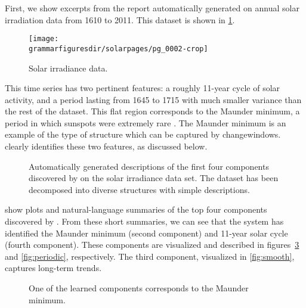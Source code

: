 First, we show excerpts from the report automatically generated on annual solar irradiation data from 1610 to 2011.
This dataset is shown in \cref{fig:solar}.
%
\begin{figure}[ht!]
\centering
\texttt{[image: \\grammarfiguresdir/solarpages/pg\_0002-crop]}
\caption[Solar irradiance dataset]
{Solar irradiance data.}
\label{fig:solar}
\end{figure}

This time series has two pertinent features: a roughly 11-year cycle of solar activity, and a period lasting from 1645 to 1715 with much smaller variance than the rest of the dataset.
This flat region corresponds to the Maunder minimum, a period in which sunspots were extremely rare \citep{lean1995reconstruction}.
The Maunder minimum is an example of the type of structure which can be captured by changewindows.
\procedurename{} clearly identifies these two features, as discussed below.



\begin{figure}[ht!]
\centering
{}
\caption[Automatically-generated descriptions of the solar irradiance data set]
{Automatically generated descriptions of the first four components discovered by \procedurename{} on the solar irradiance data set.
The dataset has been decomposed into diverse structures with simple descriptions.}
\label{fig:exec}
\end{figure}
 show plots and natural-language summaries of the top four components discovered by \procedurename{}.
From these short summaries, we can see that the system has identified the Maunder minimum (second component) and 11-year solar cycle (fourth component).
These components are visualized and described in figures~\ref{fig:maunder} and \ref{fig:periodic}, respectively. 
The third component, visualized in \cref{fig:smooth}, captures long-term trends.

\begin{figure}[ht!]
\centering
{}
\caption[A learned component corresponding to the Maunder minimum]
{One of the learned components corresponds to the Maunder minimum.}
\label{fig:maunder}
\end{figure}

